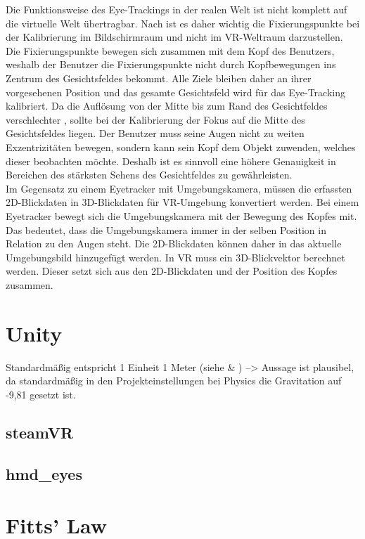 Die Funktionsweise des Eye-Trackings in der realen Welt ist nicht komplett auf die virtuelle Welt übertragbar. Nach \citeauthor{Clay_Koenig_Koenig_2019} ist es daher wichtig die Fixierungspunkte bei der Kalibrierung im Bildschirmraum und nicht im \ac{VR}-Weltraum darzustellen. Die Fixierungspunkte bewegen sich zusammen mit dem Kopf des Benutzers, weshalb der Benutzer die Fixierungspunkte nicht durch Kopfbewegungen ins Zentrum des Gesichtsfeldes bekommt. Alle Ziele bleiben daher an ihrer vorgesehenen Position und das gesamte Gesichtsfeld wird für das Eye-Tracking kalibriert. Da die Auflösung von der Mitte bis zum Rand des Gesichtfeldes verschlechter \cite{Kreylos.2017}, sollte bei der Kalibrierung der Fokus auf die Mitte des Gesichtsfeldes liegen. Der Benutzer muss seine Augen nicht zu weiten Exzentrizitäten bewegen, sondern kann sein Kopf dem Objekt zuwenden, welches dieser beobachten möchte. Deshalb ist es sinnvoll eine höhere Genauigkeit in Bereichen des stärksten Sehens des Gesichtfeldes zu gewährleisten. \cite{Clay_Koenig_Koenig_2019} \\
Im Gegensatz zu einem Eyetracker mit Umgebungskamera, müssen die erfassten 2D-Blickdaten in 3D-Blickdaten für \ac{VR}-Umgebung konvertiert werden. Bei einem Eyetracker bewegt sich die Umgebungskamera mit der Bewegung des Kopfes mit. Das bedeutet, dass die Umgebungskamera immer in der selben Position in Relation zu den Augen steht. Die 2D-Blickdaten können daher in das aktuelle Umgebungsbild hinzugefügt werden. In \ac{VR} muss ein 3D-Blickvektor berechnet werden. Dieser setzt sich aus den 2D-Blickdaten und der Position des Kopfes zusammen. \cite{Clay_Koenig_Koenig_2019}

\section{Unity}
Standardmäßig entspricht 1 Einheit 1 Meter (siehe \cite{BrentAllard.2017} \& \cite{AVividLight.2010}) --> Aussage ist plausibel, da standardmäßig in den Projekteinstellungen bei Physics die Gravitation auf -9,81 gesetzt ist.

\subsection{steamVR}

\subsection{hmd\_eyes}

\section{Fitts' Law}
